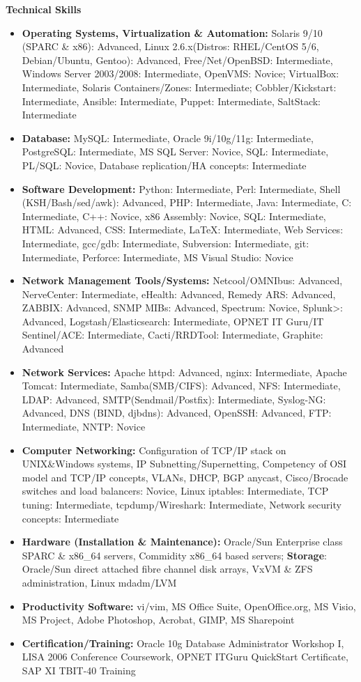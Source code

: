 \documentclass[10pt,oneside]{article}
\newenvironment{ressection}[1]{
  \vspace{4pt}
  \textbf{\selectfont\normalsize#1}
  \begin{itemize}
  \vspace{3pt}
}{
  \end{itemize}
}
\newcommand{\resitem}[1]{
  \vspace{-4pt}
  \item \begin{flushleft} #1 \end{flushleft}
}
\begin{document}
\begin{ressection}{Technical Skills}

  \resitem{\textbf{Operating Systems, Virtualization \& Automation:} Solaris 9/10 (SPARC \& x86): Advanced, Linux 2.6.x(Distros: RHEL/CentOS 5/6, Debian/Ubuntu, Gentoo): Advanced, Free/Net/OpenBSD: Intermediate, Windows Server 2003/2008: Intermediate, OpenVMS: Novice; VirtualBox: Intermediate, Solaris Containers/Zones: Intermediate; Cobbler/Kickstart: Intermediate, Ansible: Intermediate, Puppet: Intermediate, SaltStack: Intermediate}

  \resitem{\textbf{Database:} MySQL: Intermediate, Oracle 9i/10g/11g: Intermediate, PostgreSQL: Intermediate, MS SQL Server: Novice, SQL: Intermediate, PL/SQL: Novice, Database replication/HA concepts: Intermediate}

  \resitem{\textbf{Software Development:} Python: Intermediate, Perl: Intermediate, Shell (KSH/Bash/sed/awk): Advanced, PHP: Intermediate, Java: Intermediate, C: Intermediate, C++: Novice, x86 Assembly: Novice, SQL: Intermediate, HTML: Advanced, CSS: Intermediate,  \LaTeX: Intermediate,  Web Services: Intermediate, gcc/gdb: Intermediate, Subversion: Intermediate, git: Intermediate, Perforce: Intermediate, MS Visual Studio: Novice}

  \resitem{\textbf{Network Management Tools/Systems:} Netcool/OMNIbus: Advanced, NerveCenter: Intermediate, eHealth: Advanced, Remedy ARS: Advanced, ZABBIX: Advanced, SNMP MIBs: Advanced, Spectrum: Novice, Splunk>: Advanced, Logstash/Elasticsearch: Intermediate, OPNET IT Guru/IT Sentinel/ACE: Intermediate, Cacti/RRDTool: Intermediate, Graphite: Advanced}

  \resitem{\textbf{Network Services:} Apache httpd: Advanced, nginx: Intermediate, Apache Tomcat: Intermediate, Samba(SMB/CIFS): Advanced, NFS: Intermediate, LDAP: Advanced, SMTP(Sendmail/Postfix): Intermediate, Syslog-NG: Advanced, DNS (BIND, djbdns): Advanced, OpenSSH: Advanced, FTP: Intermediate, NNTP: Novice}

  \resitem{\textbf{Computer Networking:} Configuration of TCP/IP stack on UNIX\&Windows systems, IP Subnetting/Supernetting, Competency of OSI model and TCP/IP concepts, VLANs, DHCP, BGP anycast, Cisco/Brocade switches and load balancers: Novice, Linux iptables: Intermediate, TCP tuning: Intermediate, tcpdump/Wireshark: Intermediate, Network security concepts: Intermediate}

  \resitem{\textbf{Hardware (Installation \& Maintenance):} Oracle/Sun Enterprise class SPARC \& x86\_64 servers, Commidity x86\_64 based servers; \textbf{Storage}: Oracle/Sun direct attached fibre channel disk arrays, VxVM \& ZFS administration, Linux mdadm/LVM}

  \resitem{\textbf{Productivity Software:} vi/vim, MS Office Suite, OpenOffice.org, MS Visio, MS Project, Adobe Photoshop, Acrobat, GIMP, MS Sharepoint}

  \resitem{\textbf{Certification/Training:} Oracle 10g Database Administrator Workshop I, LISA 2006 Conference Coursework, OPNET ITGuru QuickStart Certificate, SAP XI TBIT-40 Training}
  
\end{ressection}
\end{document}
